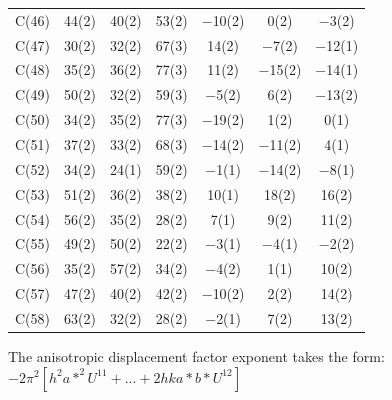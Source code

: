 \begin{center}
{\begin{supertabular}{lcccccc}
C(46)&44(2) &40(2)&53(2) &$-$10(2)&0(2) &$-$3(2)\\
C(47)&30(2) &32(2)&67(3) &14(2)&$-$7(2) &$-$12(1)\\
C(48)&35(2) &36(2)&77(3) &11(2)&$-$15(2) &$-$14(1)\\
C(49)&50(2) &32(2)&59(3) &$-$5(2)&6(2) &$-$13(2)\\
C(50)&34(2) &35(2)&77(3) &$-$19(2)&1(2) &0(1)\\
C(51)&37(2) &33(2)&68(3) &$-$14(2)&$-$11(2) &4(1)\\
C(52)&34(2) &24(1)&59(2) &$-$1(1)&$-$14(2) &$-$8(1)\\
C(53)&51(2) &36(2)&38(2) &10(1)&18(2) &16(2)\\
C(54)&56(2) &35(2)&28(2) &7(1)&9(2) &11(2)\\
C(55)&49(2) &50(2)&22(2) &$-$3(1)&$-$4(1) &$-$2(2)\\
C(56)&35(2) &57(2)&34(2) &$-$4(2)&1(1) &10(2)\\
C(57)&47(2) &40(2)&42(2) &$-$10(2)&2(2) &14(2)\\
C(58)&63(2) &32(2)&28(2) &$-$2(1)&7(2) &13(2)\\
\end{supertabular}
}
\end{center}

{ \footnotesize
The anisotropic displacement factor exponent takes the form: 
$-2\pi^2\left[ h^2a*^2U^{11} + ... + 2 h k a* b* U^{12} \right]$ }

\pagebreak

